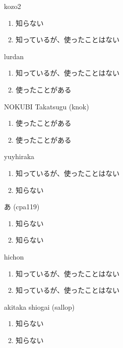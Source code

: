 \begin{prework}{ kozo2 }
  \begin{enumerate}
  \item 知らない
  \item 知っているが、使ったことはない
  \end{enumerate}
\end{prework}

\begin{prework}{ lurdan }
  \begin{enumerate}
  \item 知っているが、使ったことはない
  \item 使ったことがある
  \end{enumerate}
\end{prework}

\begin{prework}{ NOKUBI Takatsugu (knok) }
  \begin{enumerate}
  \item 使ったことがある
  \item 使ったことがある
  \end{enumerate}
\end{prework}

\begin{prework}{ yuyhiraka }
  \begin{enumerate}
  \item 知っているが、使ったことはない
  \item 知らない
  \end{enumerate}
\end{prework}

\begin{prework}{ あ (cpa119) }
  \begin{enumerate}
  \item 知らない
  \item 知らない
  \end{enumerate}
\end{prework}

\begin{prework}{ hichon }
  \begin{enumerate}
  \item 知っているが、使ったことはない
  \item 知っているが、使ったことはない
  \end{enumerate}
\end{prework}

\begin{prework}{ akitaka shiogai (sallop) }
  \begin{enumerate}
  \item 知らない
  \item 知らない
  \end{enumerate}
\end{prework}

